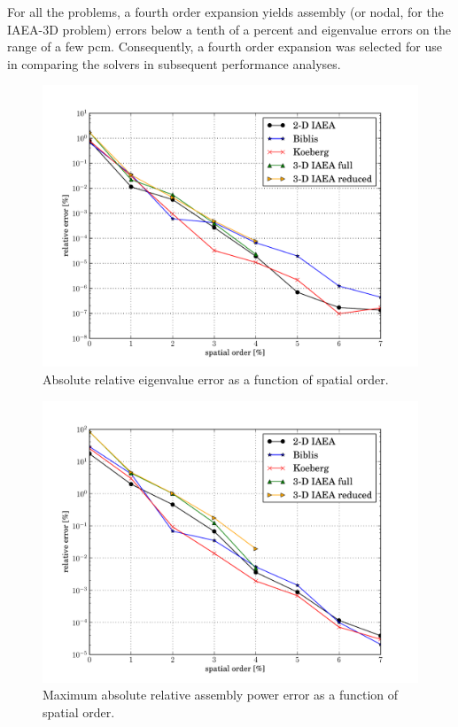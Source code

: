 
For all the problems, a fourth order expansion yields assembly 
(or nodal, for the IAEA-3D problem) errors below a tenth of a percent 
and eigenvalue errors on the range of a few pcm.  Consequently, a fourth 
order expansion was selected for use in comparing the solvers in 
subsequent performance analyses.

\begin{figure}[ht]
    \centering
    \includegraphics[keepaspectratio, width = 5.0 in]
                    {diffusion_order_study_eigenvalue}
    \caption{Absolute relative eigenvalue error as 
             a function of spatial order.}
    \label{fig:diffusion_order_study_eigenvalue}
\end{figure}

\begin{figure}[ht]
    \centering
    \includegraphics[keepaspectratio, width = 5.0 in]
                    {diffusion_order_study_power}
    \caption{Maximum absolute relative assembly power error as a function of 
             spatial order.}
    \label{fig:diffusion_order_study_power}
\end{figure}

